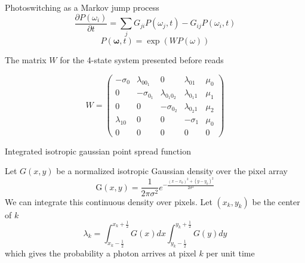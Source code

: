 \documentclass[aspectratio=169]{beamer}
\begin{document}
\begin{frame}{Photoswitching as a Markov jump process}
\begin{equation*}
\frac{\partial P(\omega_{i})}{\partial t} = \sum_{j}G_{ji}P(\omega_{j},t) - G_{ij}P(\omega_{i},t)
\end{equation*}
\begin{equation*}
P(\bm{\omega}, t) = \exp(W P(\omega))
\end{equation*}

The matrix $W$ for the 4-state system presented before reads

\begin{equation*}
W = 
\begin{pmatrix}
-\sigma_{0} & \lambda_{0 0_{1}} & 0 & \lambda_{01} & \mu_{0}\\
0 & -\sigma_{0_{1}} & \lambda_{0_{1}0_{2}} & \lambda_{0_{1}1} & \mu_{1}\\
0 & 0 & -\sigma_{0_{2}} & \lambda_{0_{2}1} & \mu_{2}\\
\lambda_{10} & 0 & 0 & -\sigma_{1} & \mu_{0}\\
0 & 0 & 0 & 0 & 0
\end{pmatrix}
\end{equation*}

\end{frame}


\begin{frame}{Integrated isotropic gaussian point spread function}

Let $G(x,y)$ be a normalized isotropic Gaussian density over the pixel array
\begin{equation*}
\mathrm{G}(x,y) = \frac{1}{2\pi\sigma^{2}}e^{-\frac{(x-x_{0})^{2}+(y-y_{0})^{2}}{2\sigma^{2}}}
\end{equation*}
We can integrate this continuous density over pixels. Let $(x_{k},y_{k})$ be the center of $k$
\begin{equation*}
\lambda_{k} = \int_{x_{k}-\frac{1}{2}}^{x_{k}+\frac{1}{2}}G(x)dx \int_{y_{k}-\frac{1}{2}}^{y_{k}+\frac{1}{2}} G(y)dy
\end{equation*}
which gives the probability a photon arrives at pixel $k$ per unit time
\end{frame}
\end{document}
